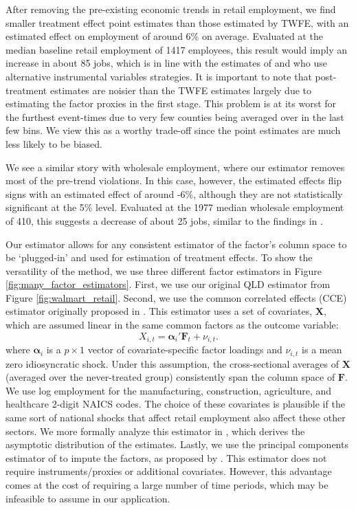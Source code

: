 \documentclass[12pt]{article}
\begin{document}
After removing the pre-existing economic trends in retail employment, we find smaller treatment effect point estimates than those estimated by TWFE, with an estimated effect on employment of around 6\% on average. Evaluated at the median baseline retail employment of 1417 employees, this result would imply an increase in about 85 jobs, which is in line with the estimates of \citet{basker2005job} and \citet{stapp2014Walmart} who use alternative instrumental variables strategies. It is important to note that post-treatment estimates are noisier than the TWFE estimates largely due to estimating the factor proxies in the first stage. This problem is at its worst for the furthest event-times due to very few counties being averaged over in the last few bins. We view this as a worthy trade-off since the point estimates are much less likely to be biased. 

We see a similar story with wholesale employment, where our estimator removes most of the pre-trend violations. In this case, however, the estimated effects flip signs with an estimated effect of around -6\%, although they are not statistically significant at the 5\% level. Evaluated at the 1977 median wholesale employment of 410, this suggests a decrease of about 25 jobs, similar to the findings in \citet{basker2005job}.

Our estimator allows for any consistent estimator of the factor's column space to be `plugged-in' and used for estimation of treatment effects. To show the versatility of the method, we use three different factor estimators in Figure \ref{fig:many_factor_estimators}. First, we use our original QLD estimator from Figure \ref{fig:walmart_retail}. Second, we use the common correlated effects (CCE) estimator originally proposed in \citet{pesaran2006estimation}. This estimator uses a set of covariates, $\bm X$, which are assumed linear in the same common factors as the outcome variable:
\begin{equation}
  X_{i,t} = \bm\alpha_i' \bm{F}_t + \nu_{i,t}.
\end{equation}
where $\bm \alpha_i$ is a $p \times 1$ vector of covariate-specific factor loadings and $\nu_{i,t}$ is a mean zero idiosyncratic shock. Under this assumption, the cross-sectional averages of $\bm X$ (averaged over the never-treated group) consistently span the column space of $\bm{F}$. We use log employment for the manufacturing, construction, agriculture, and healthcare 2-digit NAICS codes. The choice of these covariates is plausible if the same sort of national shocks that affect retail employment also affect these other sectors. We more formally analyze this estimator in \citet{Brown_Butts_Westerlund_2023}, which derives the asymptotic distribution of the estimates. Lastly, we use the principal components estimator of \citet{Bai_2009} to impute the factors, as proposed by \citet{xu2017generalized}. This estimator does not require instruments/proxies or additional covariates. However, this advantage comes at the cost of requiring a large number of time periods, which may be infeasible to assume in our application.
\end{document}
